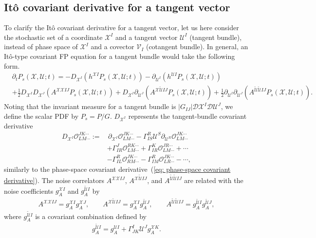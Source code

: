 \documentclass[aps, prd
, preprint
, nofootinbib 
, longbibliography
]{revtex4-1}
\newcommand{\scrD}{\mathscr{D}}
\newcommand{\calO}{\mathcal{O}}
\newcommand{\calU}{\mathcal{U}}
\newcommand{\calV}{\mathcal{V}}
\newcommand{\calX}{\mathcal{X}}
\newcommand{\bae}[1]{\begin{align} #1 \end{align}}
\begin{document}
\subsection{It\^o covariant derivative for a tangent vector}\label{sec: Ito covariant derivative for a tangent vector}

To clarify the It\^o covariant derivative for a tangent vector,
let us here consider the stochastic set of a coordinate $\calX^I$ and a tangent vector $\calU^I$ (tangent bundle), instead of phase space of $\calX^I$ and a covector $\calV_I$ (cotangent bundle).
In general, an It\^o-type covariant FP equation for a tangent bundle would take the following form.
\bae{
    &\partial_tP_s(\calX,\calU;t)=-D_{\calX^I}(h^{\calX I}P_s(\calX,\calU;t))-\partial_{\calU^I}(h^{\calU I}P_s(\calX,\calU;t)) \nonumber \\
    &+\frac{1}{2}D_{\calX^I}D_{\calX^J}(A^{\calX\calX IJ}P_s(\calX,\calU;t))+D_{\calX^I}\partial_{\calU^J}(A^{\calX\tilde{\calU}IJ}P_s(\calX,\calU;t))+\frac{1}{2}\partial_{\calU^I}\partial_{\calU^J}(A^{\tilde{\calU}\tilde{\calU}IJ}P_s(\calX,\calU;t)).
}
Noting that the invariant measure for a tangent bundle is $|G_{IJ}|\scrD\calX^I\scrD\calU^J$, we define the scalar PDF by $P_s=P/G$.
$D_{\calX^I}$ represents the tangent-bundle covariant derivative
\bae{
    D_{\calX^I}\calO^{JK\cdots}_{LM\cdots}:=&\,\partial_{\calX^I}\calO^{JK\cdots}_{LM\cdots}-\Gamma_{IS}^R\calU^S\partial_{\calU^R}\calO^{JK\cdots}_{LM\cdots} \nonumber \\
    &+\Gamma^J_{IR}\calO^{RK\cdots}_{LM\cdots}+\Gamma^K_{IR}\calO^{JR\cdots}_{LM\cdots}+\cdots \nonumber \\
    &-\Gamma_{IL}^R\calO^{JK\cdots}_{RM\cdots}-\Gamma_{IM}^R\calO^{JK\cdots}_{LR\cdots}-\cdots,
}
similarly to the phase-space covariant derivative~(\ref{eq: phase-space covariant derivative}).
The noise correlators $A^{\calX\calX IJ}$, $A^{\calX\tilde{\calU} IJ}$, and $A^{\tilde{\calU}\tilde{\calU}IJ}$ are related with the noise coefficients $g^{\calX I}_A$ and $g^{\tilde{\calU}I}_A$ by
\bae{
    A^{\calX\calX IJ}=g^{\calX I}_Ag^{\calX J}_A, \qquad A^{\calX\tilde{\calU}IJ}=g^{\calX I}_Ag^{\tilde{\calU}J}_A, \qquad A^{\tilde{\calU}\tilde{\calU}IJ}=g^{\tilde{\calU}I}_Ag^{\tilde{\calU}J}_A,
}
where $g^{\tilde{\calU}I}_A$ is a covariant combination defined by
\bae{
    g^{\tilde{\calU}I}_A=g^{\calU I}_A+\Gamma^I_{JK}\calU^Jg^{\calX K}_A.
}
\end{document}
